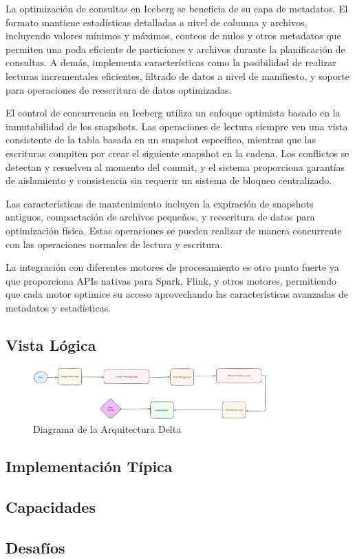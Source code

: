 La optimización de consultas en Iceberg se beneficia de su capa de metadatos. 
El formato mantiene estadísticas detalladas a nivel de columna y archivos, 
incluyendo valores mínimos y máximos, conteos de nulos y otros metadatos que permiten una poda eficiente de particiones 
y archivos durante la planificación de consultas. A
demás, implementa características como la posibilidad de realizar lecturas incrementales eficientes, 
filtrado de datos a nivel de manifiesto, y soporte para operaciones de reescritura de datos optimizadas.

El control de concurrencia en Iceberg utiliza un enfoque optimista basado en la inmutabilidad de los snapshots. 
Las operaciones de lectura siempre ven una vista consistente de la tabla basada en un snapshot específico, 
mientras que las escrituras compiten por crear el siguiente snapshot en la cadena. 
Los conflictos se detectan y resuelven al momento del commit, y el sistema proporciona garantías de aislamiento y consistencia 
sin requerir un sistema de bloqueo centralizado.

Las características de mantenimiento incluyen la expiración de snapshots antiguos, compactación de archivos pequeños, 
y reescritura de datos para optimización física. 
Estas operaciones se pueden realizar de manera concurrente con las operaciones normales de lectura y escritura.

La integración con diferentes motores de procesamiento es otro punto fuerte ya que proporciona APIs nativas para Spark, Flink, y otros motores, 
permitiendo que cada motor optimice su acceso aprovechando las características avanzadas de metadatos y estadísticas.

\subsection{Vista Lógica}

\begin{figure}[h]
\centering
\includegraphics[width=0.8\textwidth]{teorico/delta.png}
\caption{Diagrama de la Arquitectura Delta}
\label{fig:arquitectura_delta}
\end{figure}

\subsection{Implementación Típica}

\subsection{Capacidades}

\subsection{Desafíos}
